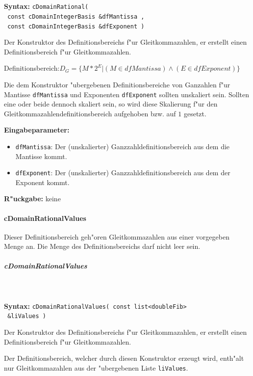 \ \\\\\noindent
\textbf{Syntax:} \verb|cDomainRational(| \\\verb| const cDomainIntegerBasis &dfMantissa ,| \\\verb| const cDomainIntegerBasis &dfExponent )|

\bigskip\noindent
Der Konstruktor des Definitionsbereichs f"ur Gleitkommazahlen, er erstellt einen Definitionsbereich f"ur Gleitkommazahlen.

Definitionsbereich:$D_G=\{ M*2^E | (M \in dfMantissa) \wedge (E \in dfExponent)\}$

Die dem Konstruktor "ubergebenen Definitionsbereiche von Ganzahlen f"ur Mantisse \verb|dfMantissa| und Exponenten \verb|dfExponent| sollten unskaliert sein. Sollten eine oder beide dennoch skaliert sein, so wird diese Skalierung f"ur den Gleitkommazahlendefinitionsbereich aufgehoben bzw. auf $1$ gesetzt.

\bigskip\noindent
\textbf{Eingabeparameter:}
\begin{itemize}
 \item \verb|dfMantissa|: Der (unskalierter) Ganzzahldefinitionsbereich aus dem die Mantisse kommt.
 \item \verb|dfExponent|: Der (unskalierter) Ganzzahldefinitionsbereich aus dem der Exponent kommt.
\end{itemize}

\bigskip\noindent
\textbf{R"uckgabe:} keine


\paragraph{cDomainRationalValues}

Dieser Definitionsbereich geh"oren Gleitkommazahlen aus einer vorgegeben Menge an. Die Menge des Definitionsbereichs darf nicht leer sein.


\subparagraph{cDomainRationalValues}

\ \\\\\noindent
\textbf{Syntax:} \verb|cDomainRationalValues( const list<doubleFib>| \\\verb| &liValues )|

\bigskip\noindent
Der Konstruktor des Definitionsbereichs f"ur Gleitkommazahlen, er erstellt einen Definitionsbereich f"ur Gleitkommazahlen.

Der Definitionsbereich, welcher durch diesen Konstruktor erzeugt wird, enth"alt nur Gleitkommazahlen aus der "ubergebenen Liste \verb|liValues|.

